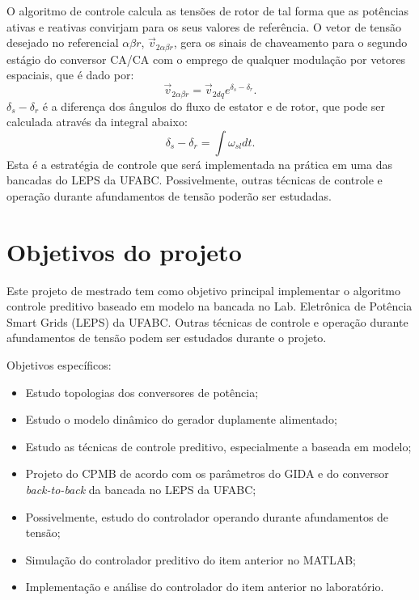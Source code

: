 	O algoritmo de controle calcula as tensões de rotor de tal forma que as potências ativas e reativas convirjam para os seus valores de referência. O vetor de tensão desejado no referencial $\alpha\beta r$, $\vec{v}_{2\alpha\beta r}$, gera os sinais de chaveamento para o segundo estágio do conversor CA/CA com o emprego de qualquer modulação por vetores espaciais, que é dado por:
	\begin{equation}
		\label{equacao:transformacao_dq_abr}
		\vec{v}_{2\alpha\beta r} = \vec{v}_{2dq}e^{\delta_s-\delta_r}.
	\end{equation}
	 $\delta_s-\delta_r$ é a diferença dos ângulos do fluxo de estator e de rotor, que pode ser calculada através da integral abaixo:
	\begin{equation}
		\label{equacao:dif_angulos_fluxo}
		\delta_s-\delta_r=\int \omega_{sl}dt.
	\end{equation}
	Esta é a estratégia de controle que será implementada na prática em uma das bancadas do LEPS da UFABC. Possivelmente, outras técnicas de controle e operação durante afundamentos de tensão poderão ser estudadas.
	
	\begingroup
		\let\clearpage\relax
		\chapter{Objetivos do projeto}
		\label{capitulo:objetivos}
	\endgroup
	
	Este projeto de mestrado tem como objetivo principal implementar o algoritmo controle preditivo baseado em modelo na bancada no Lab. Eletrônica de Potência Smart Grids (LEPS) da UFABC. Outras técnicas de controle e operação durante afundamentos de tensão podem ser estudados durante o projeto.
	
	Objetivos específicos:
	\begin{itemize}
		\item Estudo topologias dos conversores de potência;
		\item Estudo o modelo dinâmico do gerador duplamente alimentado;
		\item Estudo as técnicas de controle preditivo, especialmente a baseada em modelo;
		\item Projeto do CPMB de acordo com os parâmetros do GIDA e do conversor \emph{back-to-back} da bancada no LEPS da UFABC;
		\item Possivelmente, estudo do controlador operando durante afundamentos de tensão;
		\item Simulação do controlador preditivo do item anterior no MATLAB;
		\item Implementação e análise do controlador do item anterior no laboratório.
	\end{itemize}

